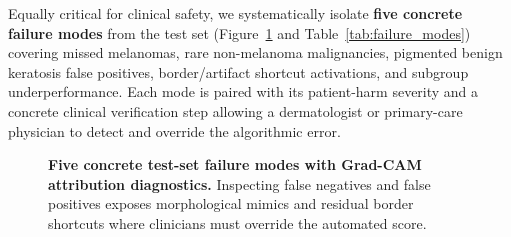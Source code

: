 Equally critical for clinical safety, we systematically isolate \textbf{five concrete failure modes} from the test set (Figure~\ref{fig:failure_modes} and Table~\ref{tab:failure_modes}) covering missed melanomas, rare non-melanoma malignancies, pigmented benign keratosis false positives, border/artifact shortcut activations, and subgroup underperformance. Each mode is paired with its patient-harm severity and a concrete clinical verification step allowing a dermatologist or primary-care physician to detect and override the algorithmic error.

\begin{figure}[htbp]
\centering
{}
\caption{\textbf{Five concrete test-set failure modes with Grad-CAM attribution diagnostics.} Inspecting false negatives and false positives exposes morphological mimics and residual border shortcuts where clinicians must override the automated score.}
\label{fig:failure_modes}
\end{figure}

\begin{table}[htbp]
\centering
\caption{\textbf{Structured clinical catalog of five concrete test-set failure modes (\texttt{reports/failure\_modes\_catalog.json}).}}
\label{tab:failure_modes}
\scriptsize

\end{table}
